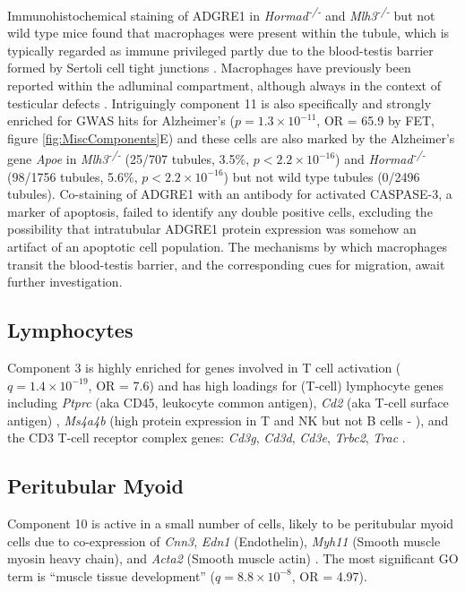 Immunohistochemical staining of ADGRE1 in \textit{Hormad\textsuperscript{-/-}} and \textit{Mlh3\textsuperscript{-/-}} but not wild type mice found that macrophages were present within the tubule, which is typically regarded as immune privileged partly due to the blood-testis barrier formed by Sertoli cell tight junctions \parencite{Fijak2006testis}.
Macrophages have previously been reported within the adluminal compartment, although always in the context of testicular defects \parencite{Frungieri2002Number, Goluza2014Macrophages}.
Intriguingly component 11 is also specifically and strongly enriched for GWAS hits for Alzheimer's ($p = 1.3\times10^{-11}$, OR = 65.9 by FET, figure \ref{fig:MiscComponents}E) and these cells are also marked by the Alzheimer's gene \textit{Apoe} in \textit{Mlh3\textsuperscript{-/-}} (25/707 tubules, 3.5\%, $p<2.2\times10^{-16}$) and \textit{Hormad\textsuperscript{-/-}} (98/1756 tubules, 5.6\%, $p<2.2\times10^{-16}$) but not wild type tubules (0/2496 tubules).
Co-staining of ADGRE1 with an antibody for activated CASPASE-3, a marker of apoptosis, failed to identify any double positive cells, excluding the possibility that intratubular ADGRE1 protein expression was somehow an artifact of an apoptotic cell population.
The mechanisms by which macrophages transit the blood-testis barrier, and the corresponding cues for migration, await further investigation.


\subsection{Lymphocytes}
Component 3 is highly enriched for genes involved in T cell activation ($q = 1.4\times10^{-19}$, OR = 7.6) and has high loadings for (T-cell) lymphocyte genes including \textit{Ptprc} (aka CD45, leukocyte common antigen), \textit{Cd2} (aka T-cell surface antigen) \parencite{Murray2011Protective, Murphy2012Janeway}, \textit{Ms4a4b} (high protein expression in T and NK but not B cells - \cite{Xu2010MS4a4B}), and the CD3 T-cell receptor complex genes: \textit{Cd3g}, \textit{Cd3d}, \textit{Cd3e}, \textit{Trbc2}, \textit{Trac} \parencite{Call2002Organizing}.


\subsection{Peritubular Myoid}

Component 10 is active in a small number of cells, likely to be peritubular myoid cells due to co-expression of \textit{Cnn3}, \textit{Edn1} (Endothelin), \textit{Myh11} (Smooth muscle myosin heavy chain), and \textit{Acta2} (Smooth muscle actin) \parencite{Mayerhofer2013Human}.
The most significant GO term is ``muscle tissue development'' ($q = 8.8\times10^{-8}$, OR = 4.97).


